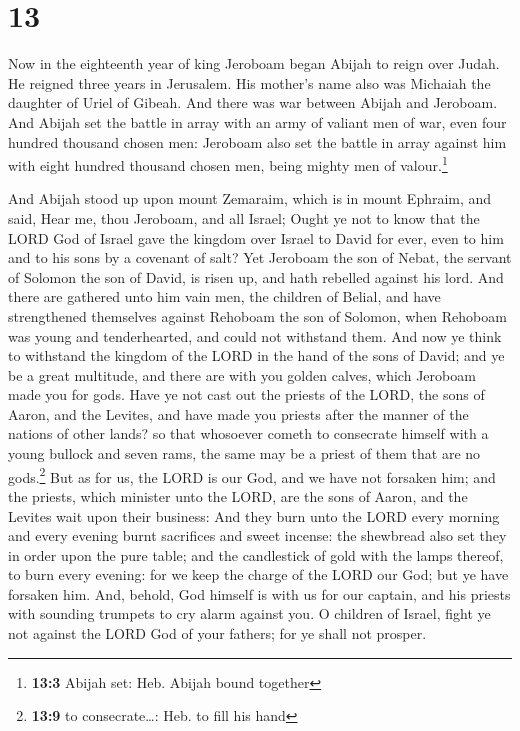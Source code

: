 \hypertarget{section-12}{%
\section{13}\label{section-12}}

 Now in the eighteenth year of king Jeroboam began Abijah
to reign over Judah.  He reigned three years in Jerusalem.
His mother's name also was Michaiah the daughter of Uriel of Gibeah. And
there was war between Abijah and Jeroboam.  And Abijah set
the battle in array with an army of valiant men of war, even four
hundred thousand chosen men: Jeroboam also set the battle in array
against him with eight hundred thousand chosen men, being mighty men of
valour.\footnote{\textbf{13:3} Abijah set: Heb. Abijah bound together}

 And Abijah stood up upon mount Zemaraim, which is in
mount Ephraim, and said, Hear me, thou Jeroboam, and all Israel;
 Ought ye not to know that the LORD God of Israel gave the
kingdom over Israel to David for ever, even to him and to his sons by a
covenant of salt?  Yet Jeroboam the son of Nebat, the
servant of Solomon the son of David, is risen up, and hath rebelled
against his lord.  And there are gathered unto him vain
men, the children of Belial, and have strengthened themselves against
Rehoboam the son of Solomon, when Rehoboam was young and tenderhearted,
and could not withstand them.  And now ye think to
withstand the kingdom of the LORD in the hand of the sons of David; and
ye be a great multitude, and there are with you golden calves, which
Jeroboam made you for gods.  Have ye not cast out the
priests of the LORD, the sons of Aaron, and the Levites, and have made
you priests after the manner of the nations of other lands? so that
whosoever cometh to consecrate himself with a young bullock and seven
rams, the same may be a priest of them that are no gods.\footnote{\textbf{13:9}
  to consecrate\ldots: Heb. to fill his hand}  But as for
us, the LORD is our God, and we have not forsaken him; and the priests,
which minister unto the LORD, are the sons of Aaron, and the Levites
wait upon their business:  And they burn unto the LORD
every morning and every evening burnt sacrifices and sweet incense: the
shewbread also set they in order upon the pure table; and the
candlestick of gold with the lamps thereof, to burn every evening: for
we keep the charge of the LORD our God; but ye have forsaken him.
 And, behold, God himself is with us for our captain, and
his priests with sounding trumpets to cry alarm against you. O children
of Israel, fight ye not against the LORD God of your fathers; for ye
shall not prosper.


